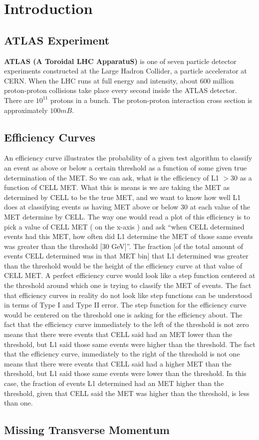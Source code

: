\chapter{Introduction}
\section{ATLAS Experiment}
\textbf{ATLAS (A Toroidal LHC ApparatuS)} is one of seven particle detector experiments constructed at the Large Hadron Collider, a particle accelerator at CERN. 
When the LHC runs at full energy and intensity, about 600 million proton-proton collisions take place every second inside the ATLAS detector. 
There are $10^{11}$ protons in a bunch. 
The proton-proton interaction cross section is approximately $100mB$.


\section{Efficiency Curves}
An efficiency curve illustrates the probability of a given test algorithm to classify an event as above or below a certain threshold as a function of some given true determination of the MET. 
So we can ask, what is the efficiency of L1 $> 30$ as a function of CELL MET. What this is means is we are taking the MET as determined by CELL to be the true MET, and we want to know how well L1 does at classifying events as having MET above or below $30$ at each value of the MET determine by CELL. 
The way one would read a plot of this efficiency is to pick a value of CELL MET ( on the x-axis ) and ask ``when CELL determined events had this MET, how often did L1 determine the MET of those same events was greater than the threshold [30 GeV]''. 
The fraction [of the total amount of events CELL determined was in that MET bin] that L1 determined was greater than the threshold would be the height of the efficiency curve at that value of CELL MET.
A perfect efficiency curve would look like a step function centered at the threshold around which one is trying to classify the MET of events. 
The fact that efficiency curves in reality do not look like step functions can be understood in terms of Type I and Type II error. 
The step function for the efficiency curve would be centered on the threshold one is asking for the efficiency about. 
The fact that the efficiency curve immediately to the left of the threshold is not zero means that there were events that CELL said had an MET lower than the threshold, but L1 said those same events were higher than the threshold. 
The fact that the efficiency curve, immediately to the right of the threshold is not one means that there were events that CELL said had a higher MET than the threshold, but L1 said those same events were lower than the threshold. 
In this case, the fraction of events L1 determined had an MET higher than the threshold, given that CELL said the MET was higher than the threshold, is less than one.
\section{Missing Transverse Momentum}

